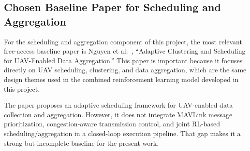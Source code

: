 \subsection{Chosen Baseline Paper for Scheduling and Aggregation}

For the scheduling and aggregation component of this project, the
most relevant free-access baseline paper is Nguyen et al.~\cite{nguyen2024acs},
``Adaptive Clustering and Scheduling for UAV-Enabled Data Aggregation.''
This paper is important because it focuses directly on UAV scheduling,
clustering, and data aggregation, which are the same design themes used
in the combined reinforcement learning model developed in this project.

The paper proposes an adaptive scheduling framework for UAV-enabled data
collection and aggregation. However, it does not integrate MAVLink message
prioritization, congestion-aware transmission control, and joint RL-based
scheduling/aggregation in a closed-loop execution pipeline. That gap makes
it a strong but incomplete baseline for the present work.

\begin{table}[h]
\centering
\small
{}
\caption{Comparison Between the Chosen Baseline Paper and the Proposed Combined Model}
\label{table:baseline_comparison}
\end{table}

